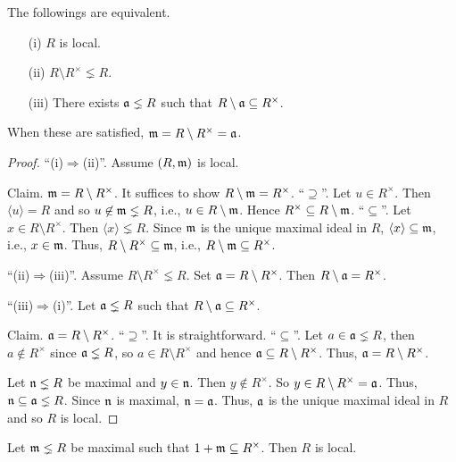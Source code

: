 \begin{proposition}
    The followings are equivalent.
    \begin{enumerate}
        \item[(i)] $R$ is local.
        \item[(ii)] $R \setminus R^\times \lneq R$.
        \item[(iii)] There exists $\mathfrak{a} \lneq R$ such that $R \setminus \mathfrak{a} \subseteq R^\times$.
    \end{enumerate}
    When these are satisfied, $\mathfrak{m} = R \setminus R^\times = \mathfrak{a}$.
\end{proposition}

\begin{proof}
    ``(i)$\Rightarrow$(ii)''. Assume $(R,\mathfrak{m})$ is local. \par
    Claim. $\mathfrak{m} = R \setminus R^\times$. It suffices to show $R \setminus \mathfrak{m} = R^\times$. ``$\supseteq$''. Let $u \in R^\times$. Then $\langle u \rangle = R$ and so $u \not \in \mathfrak{m} \lneq R$, i.e., $u \in R \setminus \mathfrak{m}$. Hence $R^\times \subseteq R \setminus \mathfrak{m}$. ``$\subseteq$''. Let $x \in R \setminus R^\times$. Then $\langle x \rangle \lneq R$. Since $\mathfrak{m}$ is the unique maximal ideal in $R$, $\langle x \rangle \subseteq \mathfrak{m}$, i.e., $x \in \mathfrak{m}$. Thus, $R \setminus R^\times \subseteq \mathfrak{m}$, i.e., $R \setminus \mathfrak{m} \subseteq R^\times$. \par 
    ``(ii)$\Rightarrow$(iii)''. Assume $R \setminus R^\times \lneq R$. Set $\mathfrak{a} = R \setminus R^\times$. Then $R \setminus \mathfrak{a} = R^\times$. \par 
    ``(iii)$\Rightarrow$(i)''. Let $\mathfrak{a} \lneq R$ such that $R \setminus \mathfrak{a} \subseteq R^\times $. \par
    Claim. $\mathfrak{a} = R \setminus R^\times$. ``$\supseteq$''. It is straightforward. ``$\subseteq$''. Let $a \in \mathfrak{a} \lneq R$, then $a \not \in R^\times$ since $\mathfrak{a} \lneq R$, so $a \in R \setminus R^\times$ and hence $\mathfrak{a} \subseteq R \setminus R^\times$. Thus, $\mathfrak{a} = R \setminus R^\times$. \par
    Let $\mathfrak{n} \lneq R$ be maximal and $y \in \mathfrak{n}$. Then $y \not \in R^\times$. So $y \in R \setminus R^\times = \mathfrak{a}$. Thus, $\mathfrak{n} \subseteq \mathfrak{a} \lneq R$. Since $\mathfrak{n}$ is maximal, $\mathfrak{n} = \mathfrak{a}$. Thus, $\mathfrak{a}$ is the unique maximal ideal in $R$ and so $R$ is local.
\end{proof}

\begin{proposition}
    Let $\mathfrak{m} \lneq R$ be maximal such that $1 + \mathfrak{m} \subseteq R^\times$. Then $R$ is local.
\end{proposition}

